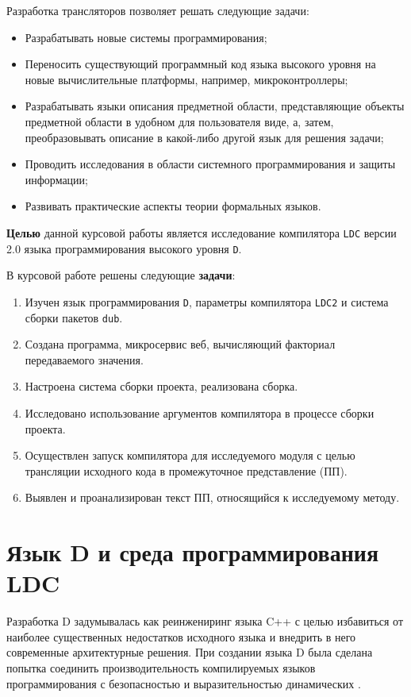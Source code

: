 \documentclass[732]{studrep}
\begin{document}
Разработка трансляторов позволяет решать следующие задачи:
\begin{itemize}
\item Разрабатывать новые системы программирования;
\item Переносить существующий программный код языка высокого уровня на новые вычислительные платформы, например, микроконтроллеры;
\item Разрабатывать языки описания предметной области, представляющие объекты предметной области в удобном для пользователя виде, а, затем, преобразовывать описание в какой-либо другой язык для решения задачи;
\item Проводить исследования в области системного программирования и защиты информации;
\item Развивать практические аспекты теории формальных языков.
\end{itemize}

\textbf{Целью} данной курсовой работы является исследование компилятора \verb|LDC| версии 2.0 языка программирования высокого уровня \verb|D|.

В курсовой работе решены следующие \textbf{задачи}:
\begin{enumerate}
\item Изучен язык программирования \verb|D|, параметры компилятора \verb|LDC2| и система сборки пакетов \verb|dub|.
\item Создана программа, микросервис веб, вычисляющий факториал передаваемого значения.
\item Настроена система сборки проекта, реализована сборка.
\item Исследовано использование аргументов компилятора в процессе сборки проекта.
\item Осуществлен запуск компилятора для исследуемого модуля с целью трансляции исходного кода в промежуточное представление (ПП).
\item Выявлен и проанализирован текст ПП, относящийся к исследуемому методу.
\end{enumerate}

\chapter{Язык D и среда программирования LDC}

Разработка D задумывалась как реинжениринг языка C++ с целью избавиться от наиболее существенных недостатков исходного языка и внедрить в него современные архитектурные решения. При создании языка D была сделана попытка соединить производительность компилируемых языков программирования с безопасностью и выразительностью динамических \cite{wikipedia}.
\end{document}
